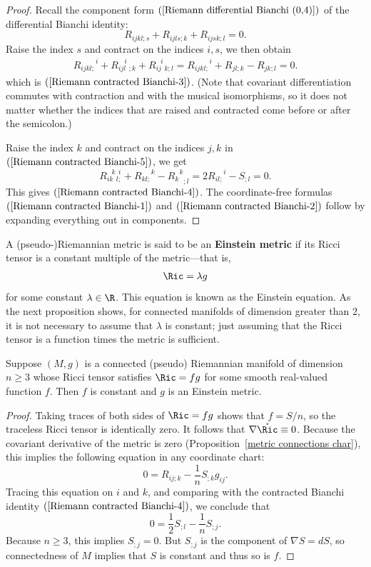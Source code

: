 \begin{proof}
Recall the component form $(\ref{Riemann differential Bianchi (0,4)})$ of the differential Bianchi identity:
\[R_{ijkl;s}+R_{ijls;k}+R_{ijsk;l}=0.\]
Raise the index $s$ and contract on the indices $i,s$, we then obtain 
\begin{align}\label{Riemann contracted Bianchi-5}
{R_{ijkl;}}^{i}+R_{ijl\ \ ;k}^{\ \ \ \ i}+R_{ij\ \ k;l}^{\ \ \ i}={R_{ijkl;}}^{i}+R_{jl;k}-R_{jk;l}=0.
\end{align}
which is $(\ref{Riemann contracted Bianchi-3})$. (Note that covariant differentiation commutes with contraction 
and with the musical isomorphisms, so it does not matter whether the indices that are raised and contracted come before or after the semicolon.)\par
Raise the index $k$ and contract on the indices $j,k$ in $(\ref{Riemann contracted Bianchi-5})$, we get
\[R_{ik\ \ l;}^{\ \ \ k\ \ i}+{R_{kl;}}^{k}-{{R_k}^k}_{;l}=2{R_{il;}}^{i}-S_{;l}=0.\]
This gives $(\ref{Riemann contracted Bianchi-4})$. The coordinate-free formulas $(\ref{Riemann contracted Bianchi-1})$ and $(\ref{Riemann contracted Bianchi-2})$ 
follow by expanding everything out in components.
\end{proof}
A (pseudo-)Riemannian metric is said to be an \textbf{Einstein metric} if its Ricci tensor is a constant multiple of the metric---that is, 
\begin{align}\label{Einstein equation}
\Ric=\lambda g
\end{align}
for some constant $\lambda\in\R$. This equation is known as the Einstein equation. As the next proposition shows, for connected manifolds of dimension greater than $2$, 
it is not necessary to assume that $\lambda$ is constant; just assuming that the Ricci tensor is a function times the metric is sufficient.
\begin{proposition}
Suppose $(M,g)$ is a connected (pseudo) Riemannian manifold of dimension $n\geq 3$ whose Ricci tensor satisfies $\Ric=fg$ for some smooth real-valued 
function $f$. Then $f$ is constant and $g$ is an Einstein metric.
\end{proposition}
\begin{proof}
Taking traces of both sides of $\Ric=fg$ shows that $f=S/n$, so the traceless Ricci tensor is identically zero. It follows that $\nabla\mathring{\Ric}\equiv 0$. Because 
the covariant derivative of the metric is zero (Proposition~\ref{metric connections char}), this implies the following equation in any coordinate chart:
\[0=R_{ij;k}-\frac{1}{n}S_{;k}g_{ij}.\]
Tracing this equation on $i$ and $k$, and comparing with the contracted Bianchi identity $(\ref{Riemann contracted Bianchi-4})$, we conclude that
\[0=\frac{1}{2}S_{;l}-\frac{1}{n}S_{;j}.\]
Because $n\geq 3$, this implies $S_{;j}=0$. But $S_{;j}$ is the component of $\nabla S=dS$, so connectedness of $M$ implies that $S$ is constant and thus so is $f$.
\end{proof}
